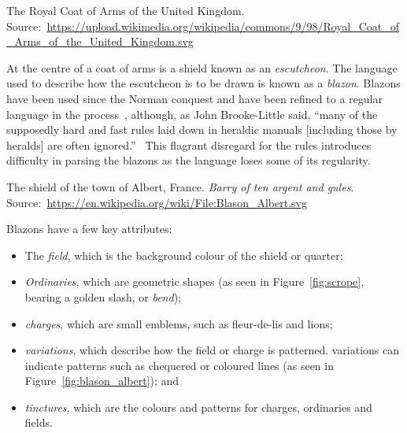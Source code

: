 \documentclass[nobib, a4paper, twoside, justified]{tufte-book}
\makeatletter
\newcommand{\charge}{\gls{charge}\@\xspace}
\newcommand{\charges}{\glspl{charge}\@\xspace}
\makeatother
\begin{document}
\begin{marginfigure}
  \centering
  \def\svgwidth{0.8\linewidth}
  
  \caption{The Royal Coat of Arms of the United Kingdom.
  Source:~\url{https://upload.wikimedia.org/wikipedia/commons/9/98/Royal_Coat_of_Arms_of_the_United_Kingdom.svg}}%
  \label{fig:royal_coa}
\end{marginfigure}

At the centre of a coat of arms is a shield known as an \textit{escutcheon}. The language used to
describe how the escutcheon is to be drawn is known as a \textit{blazon}. Blazons have been used
since the Norman conquest and have been refined to a regular language in the
process~\autocite{boutell_1864}, although, as John Brooke-Little said, ``many of the supposedly
hard and fast rules laid down in heraldic manuals [including those by heralds] are often
ignored.''~\autocite{brooke_little_1985} This flagrant disregard for the rules introduces
difficulty in parsing the blazons as the language loses some of its regularity.

\begin{marginfigure}
  \centering
  \def\svgwidth{0.8\linewidth}
  
  \caption{The shield of the town of Albert, France. \textit{Barry of ten argent and
  gules}. Source:~\url{https://en.wikipedia.org/wiki/File:Blason_Albert.svg}}\label{fig:blason_albert}
\end{marginfigure}

Blazons have a few key attributes:
\begin{itemize}
  \item The \textit{\gls{field}}, which is the background colour of the shield or quarter;
  \item \textit{Ordinaries}, which are geometric shapes (as seen in Figure~\ref{fig:scrope},
    bearing a golden slash, or \textit{bend});
  \item \textit{\Glspl{charge}}, which are small emblems, such as fleur-de-lis and lions;
  \item \textit{\Glspl{variation}}, which describe how the field or \charge{} is patterned.
    \Glspl{variation} can indicate patterns such as chequered or coloured lines (as seen in
    Figure~\ref{fig:blason_albert}); and
  \item \textit{\Glspl{tincture}}, which are the colours and patterns for \charges{}, ordinaries
    and fields.
\end{itemize}
\end{document}
